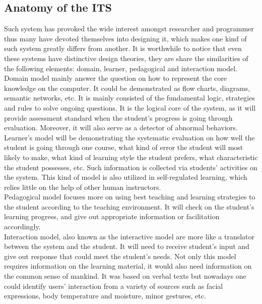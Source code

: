 \documentclass[sigconf]{acmart}
\begin{document}
\subsection{Anatomy of the ITS}
Such system has provoked the wide interest amongst researcher and programmer thus many have devoted themselves into designing it, which makes one kind of such system greatly differs from another. It is worthwhile to notice that even these systems have distinctive design theories, they are share the similarities of the following elements: domain, learner, pedagogical and interaction model.\\
Domain model mainly answer the question on how to represent the core knowledge on the computer. It could be demonstrated as flow charts, diagrams, semantic networks, etc. It is mainly consisted of the fundamental logic, strategies and rules to solve ongoing questions. It is the logical core of the system, as it will provide assessment standard when the student's progress is going through evaluation. Moreover, it will also serve as a detector of abnormal behaviors\cite{Ferguson2012}.\\
Learner's model will be demonstrating the systematic evaluation on how well the student is going through one course, what kind of error the student will most likely to make, what kind of learning style the student prefers, what characteristic the student possesses, etc. Such information is collected via students' activities on the system. This kind of model is also utilized in self-regulated learning, which relies little on the help of other human instructors. \\
Pedagogical model focuses more on using best teaching and learning strategies to the student according to the teaching environment. It will check on the student's learning progress, and give out appropriate information or facilitation accordingly.\\
Interaction model, also known as the interactive model are more like a translator between the system and the student. It will need to receive student's input and give out response that could meet the student's needs. Not only this model requires information on the learning material, it would also need information on the common sense of mankind. It was based on verbal texts but nowadays one could identify users' interaction from a variety of sources such as facial expressions, body temperature and moisture, minor gestures, etc.\\
\end{document}

